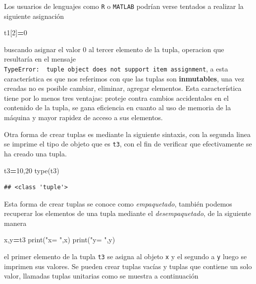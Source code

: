 \documentclass[
]{book}
\newenvironment{Shaded}{\begin{snugshade}}{\end{snugshade}}
\newcommand{\BuiltInTok}[1]{#1}
\newcommand{\DecValTok}[1]{\textcolor[rgb]{0.00,0.00,0.81}{#1}}
\newcommand{\NormalTok}[1]{#1}
\newcommand{\OperatorTok}[1]{\textcolor[rgb]{0.81,0.36,0.00}{\textbf{#1}}}
\newcommand{\StringTok}[1]{\textcolor[rgb]{0.31,0.60,0.02}{#1}}
\theoremstyle{definition}
\theoremstyle{definition}
\theoremstyle{definition}
\theoremstyle{definition}
\theoremstyle{remark}
\begin{document}
Los usuarios de lenguajes como \texttt{R} o \texttt{MATLAB} podrían verse tentados a realizar la siguiente asignación

\begin{Shaded}
\begin{Highlighting}[]
\NormalTok{t1[}\DecValTok{2}\NormalTok{]}\OperatorTok{=}\DecValTok{0}
\end{Highlighting}
\end{Shaded}

buscando asignar el valor 0 al tercer elemento de la tupla, operacion que resultaría en el mensaje \texttt{TypeError:\ \ \textquotesingle{}tuple\textquotesingle{}\ object\ does\ not\ support\ item\ assignment}, a esta característica es que nos referimos con que las tuplas son \textbf{inmutables}, una vez creadas no es posible cambiar, eliminar, agregar elementos. Esta característica tiene por lo menos tres ventajas: proteje contra cambios accidentales en el contenido de la tupla, se gana eficiencia en cuanto al uso de memoria de la máquina y mayor rapidez de acceso a sus elementos.

Otra forma de crear tuplas es mediante la siguiente sintaxis, con la segunda linea se imprime el tipo de objeto que es \texttt{t3}, con el fin de verificar que efectivamente se ha creado una tupla.

\begin{Shaded}
\begin{Highlighting}[]
\NormalTok{t3}\OperatorTok{=}\DecValTok{10}\NormalTok{,}\DecValTok{20} 
\BuiltInTok{type}\NormalTok{(t3)  }
\end{Highlighting}
\end{Shaded}

\begin{verbatim}
## <class 'tuple'>
\end{verbatim}

Esta forma de crear tuplas se conoce como \emph{empaquetado}, también podemos recuperar los elementos de una tupla mediante el \emph{desempaquetado}, de la siguiente manera

\begin{Shaded}
\begin{Highlighting}[]
\NormalTok{x,y}\OperatorTok{=}\NormalTok{t3}
\BuiltInTok{print}\NormalTok{(}\StringTok{"x= "}\NormalTok{,x)}
\BuiltInTok{print}\NormalTok{(}\StringTok{"y= "}\NormalTok{,y)}
\end{Highlighting}
\end{Shaded}

el primer elemento de la tupla \texttt{t3} se asigna al objeto \texttt{x} y el segundo a \texttt{y} luego se imprimen sus valores. Se pueden crear tuplas vacías y tuplas que contiene un solo valor, llamadas tuplas unitarias como se muestra a continuación
\end{document}
